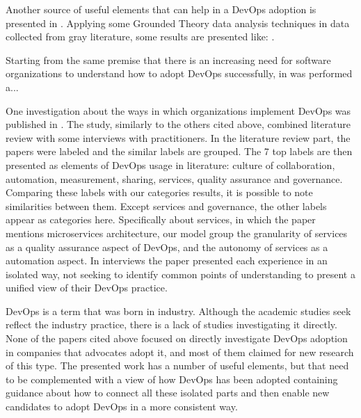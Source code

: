 Another source of useful elements that can help in a DevOps adoption is
presented in \cite{characterizing_devops_sbes_2016}. Applying some Grounded
Theory data analysis techniques in data collected from gray literature, some
results are presented like: .


Starting from the same premise that there is an increasing need for software
organizations to understand how to adopt DevOps successfully, in
\cite{devops_a_definition_xp_15} was performed a...

One investigation about the ways in which organizations implement DevOps was
published in \cite{qualitative_devops_journalsw_17}. The study, similarly
to the others cited above, combined literature review with some interviews with
practitioners. In the literature review part, the papers were labeled and the
similar labels are grouped. The 7 top labels are then presented as elements of
DevOps usage in literature: culture of collaboration, automation, measurement,
sharing, services, quality assurance and governance. Comparing these labels
with our categories results, it is possible to note similarities between them.
Except services and governance, the other labels appear as categories here.
Specifically about services, in which the paper mentions microservices
architecture, our model group the granularity of services as a quality
assurance aspect of DevOps, and the autonomy of services as a automation aspect.
In interviews the paper presented each experience in an isolated way, not
seeking to identify common points of understanding to present a unified view
of their DevOps practice.

DevOps is a term that was born in industry. Although the academic studies seek
reflect the industry practice, there is a lack of studies investigating it
directly. None of the papers cited above focused on directly investigate
DevOps adoption in companies that advocates adopt it, and most of them claimed
for new research of this type. The presented work has a number of useful
elements, but that need to be complemented with a view of how DevOps has been
adopted containing guidance about how to connect all these isolated parts and
then enable new candidates to adopt DevOps in a more consistent way.
